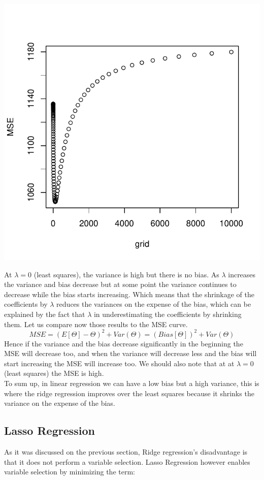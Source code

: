 \documentclass[]{report}
\begin{document}
\begin{center}
	\includegraphics[width=0.8\linewidth]{Figures/ridge_mse.pdf}
\end{center}

At $\lambda=0$ (least squares), the variance is high but there is no bias.
As $\lambda$ increases the variance and bias decrease but at some point the variance continues to decrease while the bias starts increasing. Which means that the shrinkage of the coefficients by $\lambda$ reduces the variances on the expense of the bias, which can be explained by the fact that $\lambda$ in underestimating the coefficients by shrinking them. Let us compare now those results to the MSE curve. 
$$MSE = (E[\varTheta]-\varTheta)^{2} + Var(\varTheta) = (Bias[\varTheta])^{2} + Var(\varTheta)$$
Hence if the variance and the bias decrease significantly in the beginning the MSE will decrease too, and when the variance will decrease less and the bias will start increasing the MSE will increase too. We should also note that at at  $\lambda=0$ (least squares) the MSE is high.\\
To sum up, in linear regression we can have a low bias but a high variance, this is where the ridge regression improves over the least squares because it shrinks the variance on the expense of the bias.

\subsection{Lasso Regression}
As it was discussed on the previous section, Ridge regression's disadvantage is that it does not perform a variable selection. Lasso Regression however enables variable selection by minimizing the term:
\end{document}
